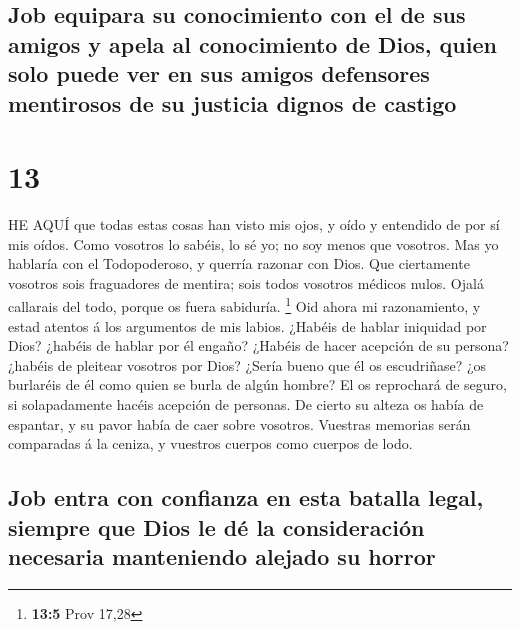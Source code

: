 \hypertarget{job-equipara-su-conocimiento-con-el-de-sus-amigos-y-apela-al-conocimiento-de-dios-quien-solo-puede-ver-en-sus-amigos-defensores-mentirosos-de-su-justicia-dignos-de-castigo}{%
\subsection{Job equipara su conocimiento con el de sus amigos y apela al
conocimiento de Dios, quien solo puede ver en sus amigos defensores
mentirosos de su justicia dignos de
castigo}\label{job-equipara-su-conocimiento-con-el-de-sus-amigos-y-apela-al-conocimiento-de-dios-quien-solo-puede-ver-en-sus-amigos-defensores-mentirosos-de-su-justicia-dignos-de-castigo}}

\hypertarget{section-12}{%
\section{13}\label{section-12}}

 HE AQUÍ que todas estas cosas han visto mis ojos, y oído y
entendido de por sí mis oídos.  Como vosotros lo sabéis, lo
sé yo; no soy menos que vosotros.  Mas yo hablaría con el
Todopoderoso, y querría razonar con Dios.  Que ciertamente
vosotros sois fraguadores de mentira; sois todos vosotros médicos nulos.
 Ojalá callarais del todo, porque os fuera sabiduría.
\footnote{\textbf{13:5} Prov 17,28}  Oid ahora mi
razonamiento, y estad atentos á los argumentos de mis labios.
 ¿Habéis de hablar iniquidad por Dios? ¿habéis de hablar por
él engaño?  ¿Habéis de hacer acepción de su persona? ¿habéis
de pleitear vosotros por Dios?  ¿Sería bueno que él os
escudriñase? ¿os burlaréis de él como quien se burla de algún hombre?
 El os reprochará de seguro, si solapadamente hacéis
acepción de personas.  De cierto su alteza os había de
espantar, y su pavor había de caer sobre vosotros. 
Vuestras memorias serán comparadas á la ceniza, y vuestros cuerpos como
cuerpos de lodo.

\hypertarget{job-entra-con-confianza-en-esta-batalla-legal-siempre-que-dios-le-duxe9-la-consideraciuxf3n-necesaria-manteniendo-alejado-su-horror}{%
\subsection{Job entra con confianza en esta batalla legal, siempre que
Dios le dé la consideración necesaria manteniendo alejado su
horror}\label{job-entra-con-confianza-en-esta-batalla-legal-siempre-que-dios-le-duxe9-la-consideraciuxf3n-necesaria-manteniendo-alejado-su-horror}}

